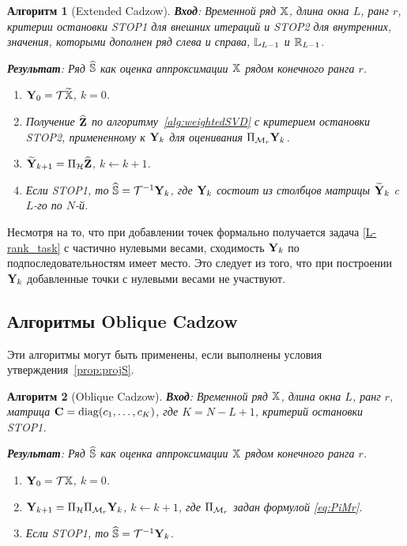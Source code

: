 \documentclass[12pt,a4paper,fleqn,leqno]{article}
\newtheorem{algorithm}{Алгоритм}%
\begin{document}
\begin{algorithm}[Extended Cadzow]
\textbf{Вход}: Временной ряд $\mathbb{X}$, длина окна $L$, ранг $r$,
критерии остановки STOP1 для внешних итераций и STOP2 для внутренних,
значения, которыми дополнен ряд слева и справа, $\mathbb{L}_{L-1}$ и $\mathbb{R}_{L-1}$.

\textbf{Результат}:
Ряд $\widehat{\mathbb{S}}$ как оценка аппроксимации $\mathbb{X}$ рядом конечного ранга $r$.

\begin{enumerate}
\item
$\mathbf{Y}_0 = \mathcal{T} \widetilde{\mathbb{X}}$, $k=0$.
\item
Получение $\widehat{\mathbf{Z}}$ по алгоритму~\ref{alg:weightedSVD} с критерием остановки STOP2, примененному к $\mathbf{Y}_k$ для оценивания $\Pi_{\mathcal{M}_r} \mathbf{Y}_{k}$.
\item
$\widetilde{\mathbf{Y}}_{k+1} = \Pi_{\mathcal{H}}  \widehat{\mathbf{Z}}$, $k\leftarrow k+1$.
\item
Если STOP1, то $\widehat{\mathbb{S}} = \mathcal{T}^{-1} \mathbf{Y}_k$, где $\mathbf{Y}_k$ состоит из столбцов матрицы $\widetilde{\mathbf{Y}}_{k}$
c $L$-го по $N$-й.
\end{enumerate}
\end{algorithm}

\begin{remark}
Несмотря на то, что при добавлении точек формально получается задача \eqref{L-rank_task} с частично нулевыми весами, сходимость $\mathbf{Y}_k$
по подпоследовательностям имеет место. Это следует из того, что при построении $\mathbf{Y}_k$ добавленные точки с нулевыми весами
не участвуют.
\end{remark}

\subsection{Алгоритмы Oblique Cadzow}

Эти алгоритмы могут быть применены, если выполнены условия утверждения~\ref{prop:projS}.

\begin{algorithm}[Oblique Cadzow]
\label{alg:obliqueCadzow}
\textbf{Вход}: Временной ряд $\mathbb{X}$, длина окна $L$, ранг $r$, матрица $\mathbf{C}=\mathop{\mathrm{diag}}(c_1,\ldots, c_K)$, где $K=N-L+1$,
критерий остановки STOP1.

\textbf{Результат}:
Ряд $\widehat{\mathbb{S}}$ как оценка аппроксимации $\mathbb{X}$ рядом конечного ранга $r$.

\begin{enumerate}
\item
$\mathbf{Y}_0 = \mathcal{T} \mathbb{X}$, $k=0$.
\item
$\mathbf{Y}_{k+1} = \Pi_{\mathcal{H}}  \Pi_{\mathcal{M}_r} \mathbf{Y}_{k}$, $k\leftarrow k+1$, где
$\Pi_{\mathcal{M}_r}$ задан формулой \eqref{eq:PiMr}.
\item
Если STOP1, то $\widehat{\mathbb{S}} = \mathcal{T}^{-1} \mathbf{Y}_k$.
\end{enumerate}
\end{algorithm}
\end{document}
